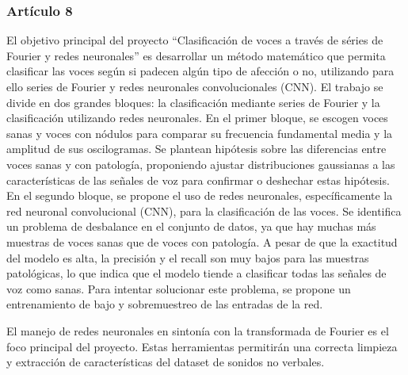 \subsubsection*{Artículo 8}
    El objetivo principal del proyecto ``Clasificación de voces a través de séries de Fourier y redes neuronales''\cite{gomez2023clasificacion} es desarrollar un método matemático que permita clasificar las voces según si padecen algún tipo de afección o no, utilizando para ello series de Fourier y redes neuronales convolucionales (CNN).
    El trabajo se divide en dos grandes bloques: la clasificación mediante series de Fourier y la clasificación utilizando redes neuronales. En el primer bloque, se escogen voces sanas y voces con nódulos para comparar su frecuencia fundamental media y la amplitud de sus oscilogramas. Se plantean hipótesis sobre las diferencias entre voces sanas y con patología, proponiendo ajustar distribuciones gaussianas a las características de las señales de voz para confirmar o deshechar estas hipótesis.
    \\En el segundo bloque, se propone el uso de redes neuronales, específicamente la red neuronal convolucional (CNN), para la clasificación de las voces. Se identifica un problema de desbalance en el conjunto de datos, ya que hay muchas más muestras de voces sanas que de voces con patología. A pesar de que la exactitud del modelo es alta, la precisión y el recall son muy bajos para las muestras patológicas, lo que indica que el modelo tiende a clasificar todas las señales de voz como sanas. Para intentar solucionar este problema, se propone un entrenamiento de bajo y sobremuestreo de las entradas de la red.

    El manejo de redes neuronales en sintonía con la transformada de Fourier es el foco principal del proyecto. Estas herramientas permitirán una correcta limpieza y extracción de características del dataset de sonidos no verbales.
\newpage
